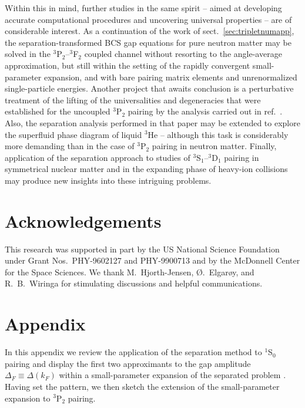 Within this in mind, further studies in the same spirit -- aimed at 
developing accurate computational procedures and uncovering universal 
properties -- are of considerable interest.  As a continuation of
the work of sect.~\ref{sec:tripletnumapp}, the separation-transformed 
BCS gap equations for pure neutron matter may be solved in the
$^3$P$_2$--$^3$F$_2$ coupled channel without resorting to the angle-average 
approximation, but still within the setting of the rapidly convergent 
small-parameter expansion, and with bare pairing matrix elements and 
unrenormalized single-particle energies.  Another project that awaits 
conclusion is a perturbative treatment of the lifting of the 
universalities and degeneracies that were established for the
uncoupled $^3$P$_2$ pairing by the analysis carried out in 
ref.~\cite{univ}.  Also, the separation analysis performed in
that paper may be extended to explore the superfluid phase
diagram of liquid $^3$He -- although this task is considerably
more demanding than in the case of $^3$P$_2$ pairing in neutron 
matter.  Finally, application of the separation approach to studies 
of $^3$S$_1$--$^3$D$_1$ pairing in symmetrical nuclear matter and 
in the expanding phase of heavy-ion collisions may produce new 
insights into these intriguing problems.

\section{Acknowledgements}
This research was supported in part by the US National Science
Foundation under Grant Nos.~PHY-9602127 and PHY-9900713 and 
by the McDonnell Center for the Space Sciences.  We thank
M.~Hjorth-Jensen, {\O}.~Elgar{\o}y, and R.~B.~Wiringa for 
stimulating discussions and helpful communications.

\section{Appendix}

In this appendix we review the application of the separation method
to $^1$S$_0$ pairing \cite{kkc} and display the first two approximants
to the gap amplitude $\Delta_F \equiv \Delta(k_F)$ within a
small-parameter expansion of the separated problem \cite{luso}.  
Having set the pattern, we then sketch the extension of the 
small-parameter expansion to $^3$P$_2$ pairing.

